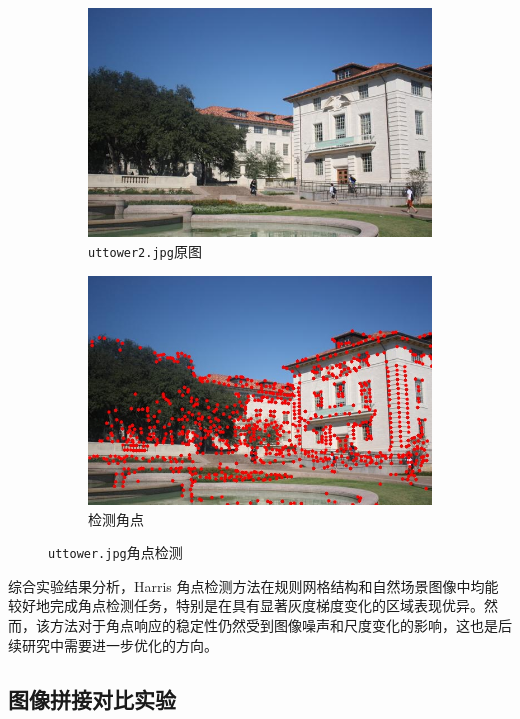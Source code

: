 \documentclass[a4paper, utf8]{ctexart}
\begin{document}
\begin{figure}[htbp]
		\begin{subfigure}{.45\textwidth}
			\centering
			\includegraphics[height=.15\textheight]{./figure/uttower2.jpg}
			\caption{\texttt{uttower2.jpg}原图}
		\end{subfigure}
		\begin{subfigure}{.45\textwidth}
			\centering
			\includegraphics[height=.15\textheight]{./figure/uttower2_keypoints.jpg}
			\caption{检测角点}
		\end{subfigure}
		\caption{\texttt{uttower.jpg}角点检测}
	\end{figure}
	
	综合实验结果分析，Harris 角点检测方法在规则网格结构和自然场景图像中均能较好地完成角点检测任务，特别是在具有显著灰度梯度变化的区域表现优异。然而，该方法对于角点响应的稳定性仍然受到图像噪声和尺度变化的影响，这也是后续研究中需要进一步优化的方向。
	
	\subsection{图像拼接对比实验}
	
\end{document}
